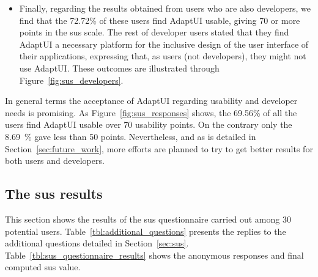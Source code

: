\begin{itemize}
  \item Finally, regarding the results obtained from users who are also 
  developers, we find that the 72.72\% of these users find AdaptUI usable, 
  giving 70 or more points in the \ac{sus} scale. The rest of developer users 
  stated that they find AdaptUI a necessary platform for the inclusive design of 
  the user interface of their applications, expressing that, as users (not 
  developers), they might not use AdaptUI. These outcomes are illustrated
  through Figure~\ref{fig:sus_developers}.
\end{itemize}

In general terms the acceptance of AdaptUI regarding usability and developer
needs is promising. As Figure~\ref{fig:sus_responses} shows, the 69.56\% of all 
the users find AdaptUI usable over 70 usability points. On the contrary only
the 8.69~\% gave less than 50 points. Nevertheless, and as is detailed in 
Section~\ref{sec:future_work}, more efforts are planned to try to get better
results for both users and developers.

\subsection{The \ac{sus} results}
\label{sec:sus_results}
 
This section shows the results of the \ac{sus} questionnaire carried out among
30 potential users. Table~\ref{tbl:additional_questions} presents the replies 
to the additional questions detailed in Section~\ref{sec:sus}.
Table~\ref{tbl:sus_questionnaire_results} shows the anonymous responses and final
computed \ac{sus} value.

